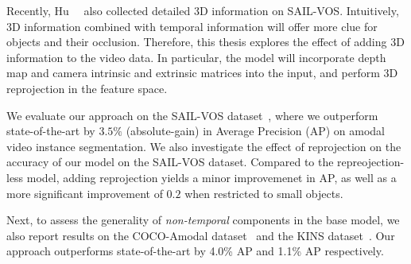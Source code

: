 Recently, Hu~\etal~\cite{HuCVPR2021} also collected detailed 3D information on SAIL-VOS. Intuitively, 3D information combined with temporal information will offer more clue for objects and their occlusion. Therefore, this thesis explores the effect of adding 3D information to the video data.  In particular, the model will incorporate depth map and camera intrinsic and extrinsic matrices into the input, and perform 3D reprojection in the feature space.


We evaluate our approach on the SAIL-VOS dataset~\cite{hu2019sail}, where we outperform state-of-the-art by $3.5\%$ (absolute-gain) in Average Precision (AP) on amodal video instance segmentation. 
We also investigate the effect of reprojection on the accuracy of our model on the SAIL-VOS dataset. Compared to the repreojection-less 
model, adding reprojection yields a minor improvemenet in AP, as well as a more significant improvement of $0.2$ when restricted to small 
objects.

Next, to assess the generality of \textit{non-temporal} components in the base model,
we also report results on the COCO-Amodal dataset~\cite{zhu2017semantic} and the KINS dataset~\cite{qi2019amodal}.
Our approach outperforms state-of-the-art by 4.0\% AP and 1.1\% AP respectively.
